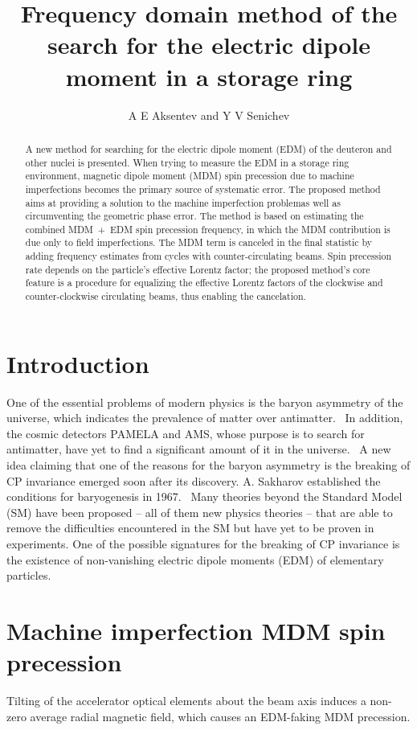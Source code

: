 \documentclass[a4paper]{jpconf}
\begin{document}
	\title{Frequency domain method of the search for the electric dipole moment in a storage ring}
	\author{A E Aksentev and Y V Senichev}
	\address{Institute for Nuclear Research of the Russian Academy of Sciences, Moscow, Russia}

	\begin{abstract}
		A new method for searching for the electric dipole moment (EDM) of the deuteron and other nuclei is presented. When trying to measure the EDM in a storage ring environment, magnetic dipole moment (MDM) spin precession due to machine imperfections becomes the primary source of systematic error. The proposed method aims at providing a solution to the machine imperfection problemas well as circumventing the geometric phase error. The method is based on estimating the combined MDM~+~EDM spin precession frequency, in which the MDM contribution is due only to field imperfections. The MDM term is canceled in the final statistic by  adding frequency estimates from cycles with counter-circulating beams. Spin precession rate depends on the particle's effective Lorentz factor; the proposed method's core feature is a procedure for equalizing the effective Lorentz factors of the clockwise and counter-clockwise circulating beams, thus enabling the cancelation.
	\end{abstract}

\section{Introduction}
One of the essential problems of modern physics is the baryon asymmetry of the universe, which indicates the prevalence of matter over antimatter.~\cite{Canetti} In addition, the cosmic detectors PAMELA and AMS, whose purpose is to search for antimatter, have yet to find a significant amount of it in the universe.~\cite{Aguilar} A new idea claiming that one of the reasons for the baryon asymmetry is the breaking of CP invariance emerged soon after its discovery. A. Sakharov established the conditions for baryogenesis in 1967.~\cite{Sakharov} Many theories beyond the Standard Model (SM) have been proposed -- all of them new physics theories -- that are able to remove the difficulties encountered in the SM but have yet to be proven in experiments. One of the possible signatures for the breaking of CP invariance is the existence of non-vanishing electric dipole moments (EDM) of elementary particles.

\section{Machine imperfection MDM spin precession}
Tilting of the accelerator optical elements about the beam axis induces a non-zero average radial magnetic field, which causes an EDM-faking MDM precession. 
\end{document}
